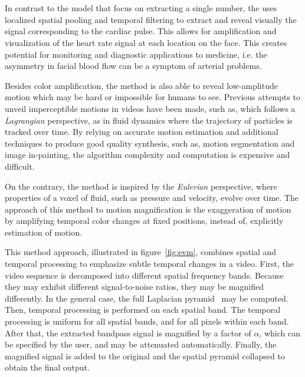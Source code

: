 \section{\evm} \label{sec:evm}

In contrast to the \ica{} model that focus on extracting a single number,
the \evm{} uses localized spatial pooling and temporal filtering to extract
and reveal visually the signal corresponding to the cardiac pulse. This
allows for amplification and visualization of the heart rate signal at each 
location on the face. This creates potential for monitoring and diagnostic
applications to medicine, i.e. the asymmetry in facial blood flow can be a 
symptom of arterial problems.

Besides color amplification, the \evm{} method is also able to reveal 
low-amplitude motion which may be hard or impossible for humans to see.
Previous attempts to unveil imperceptible motions in videos have been 
made, such as, \cite{Liu2005Motion} which follows a \emph{Lagrangian}
perspective, as in fluid dynamics where the trajectory of particles
is tracked over time. By relying on accurate motion estimation and
additional techniques to produce good quality synthesis, such as, 
motion segmentation and image in-painting, the algorithm complexity 
and computation is expensive and difficult.

On the contrary, the \evm{} method is inspired by the \emph{Eulerian}
perspective, where properties of a voxel of fluid, such as pressure 
and velocity, evolve over time. The approach of this method to motion 
magnification is the exaggeration of motion by amplifying temporal 
color changes at fixed positions, instead of, explicitly estimation 
of motion.

This method approach, illustrated in figure~\ref{fig:evm}, combines 
spatial and temporal processing to emphasize subtle temporal changes 
in a video. First, the video sequence is decomposed into different 
spatial frequency bands. Because they may exhibit different 
signal-to-noise ratios, they may be magnified differently.
In the general case, the full Laplacian pyramid~\cite{Burt1983Laplacian}
may be computed. Then, temporal processing is performed on each 
spatial band. The temporal processing is uniform for all spatial 
bands, and for all pixels within each band. After that, the extracted
bandpass signal is magnified by a factor of $\alpha$, which can be 
specified by the user, and may be attenuated automatically. Finally, 
the magnified signal is added to the original and the spatial pyramid
collapsed to obtain the final output.

